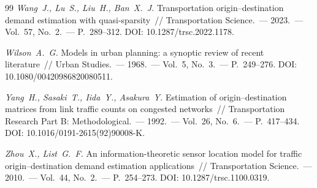 \documentclass{crm-article}
\begin{document}
\begin{thebibliography}{99}
{\it Wang~J., Lu~S., Liu~H., Ban~X.~J.}
Transportation origin--destination demand estimation with quasi-sparsity~//
Transportation Science.~--- 2023.~--- Vol.~57, No.~2.~--- P.~289--312.
DOI: 10.1287/trsc.2022.1178.

{\it Wilson~A.~G.}
Models in urban planning: a synoptic review of recent literature~// Urban
Studies.~--- 1968.~--- Vol.~5, No.~3.~--- P.~249--276.
DOI: 10.1080/00420986820080511.

{\it Yang~H., Sasaki~T., Iida~Y., Asakura~Y.}
Estimation of origin--destination matrices from link traffic counts on
congested networks~// Transportation Research Part B: Methodological.~---
1992.~--- Vol.~26, No.~6.~--- P.~417--434.
DOI: 10.1016/0191-2615(92)90008-K.

{\it Zhou~X., List~G.~F.}
An information-theoretic sensor location model for traffic
origin--destination demand estimation applications~// Transportation
Science.~--- 2010.~--- Vol.~44, No.~2.~--- P.~254--273.
DOI: 10.1287/trsc.1100.0319.

\end{thebibliography}
\end{document}
